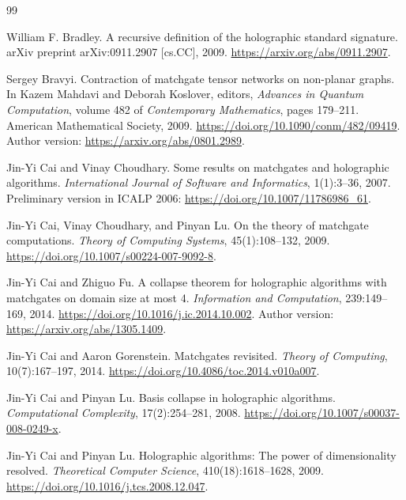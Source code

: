 \documentclass[11pt]{article}
\theoremstyle{definition}
\theoremstyle{remark}
\begin{document}
\begin{thebibliography}{99}

William F. Bradley.
\newblock A recursive definition of the holographic standard signature.
\newblock arXiv preprint arXiv:0911.2907 [cs.CC], 2009.
\newblock \url{https://arxiv.org/abs/0911.2907}.

Sergey Bravyi.
\newblock Contraction of matchgate tensor networks on non-planar graphs.
\newblock In Kazem Mahdavi and Deborah Koslover, editors,
\emph{Advances in Quantum Computation}, volume 482 of
\emph{Contemporary Mathematics}, pages 179--211. American Mathematical
Society, 2009.
\newblock \url{https://doi.org/10.1090/conm/482/09419}.
\newblock Author version: \url{https://arxiv.org/abs/0801.2989}.

Jin-Yi Cai and Vinay Choudhary.
\newblock Some results on matchgates and holographic algorithms.
\newblock \emph{International Journal of Software and Informatics},
1(1):3--36, 2007.
\newblock Preliminary version in ICALP 2006:
\url{https://doi.org/10.1007/11786986_61}.

Jin-Yi Cai, Vinay Choudhary, and Pinyan Lu.
\newblock On the theory of matchgate computations.
\newblock \emph{Theory of Computing Systems}, 45(1):108--132, 2009.
\newblock \url{https://doi.org/10.1007/s00224-007-9092-8}.

Jin-Yi Cai and Zhiguo Fu.
\newblock A collapse theorem for holographic algorithms with matchgates on
domain size at most 4.
\newblock \emph{Information and Computation}, 239:149--169, 2014.
\newblock \url{https://doi.org/10.1016/j.ic.2014.10.002}.
\newblock Author version: \url{https://arxiv.org/abs/1305.1409}.

Jin-Yi Cai and Aaron Gorenstein.
\newblock Matchgates revisited.
\newblock \emph{Theory of Computing}, 10(7):167--197, 2014.
\newblock \url{https://doi.org/10.4086/toc.2014.v010a007}.

Jin-Yi Cai and Pinyan Lu.
\newblock Basis collapse in holographic algorithms.
\newblock \emph{Computational Complexity}, 17(2):254--281, 2008.
\newblock \url{https://doi.org/10.1007/s00037-008-0249-x}.

Jin-Yi Cai and Pinyan Lu.
\newblock Holographic algorithms: The power of dimensionality resolved.
\newblock \emph{Theoretical Computer Science}, 410(18):1618--1628, 2009.
\newblock \url{https://doi.org/10.1016/j.tcs.2008.12.047}.


\end{thebibliography}
\end{document}
